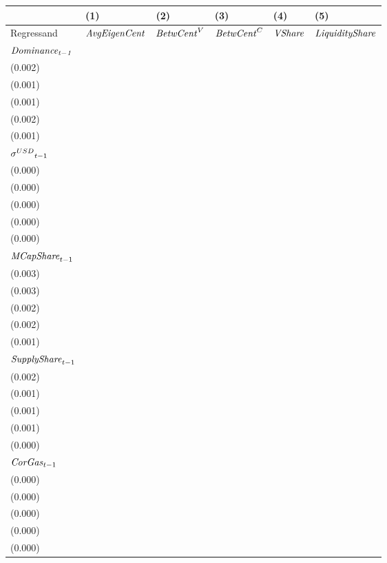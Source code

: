\begin{tabular}{llllll}
\toprule
{} &                                   (1) &                                   (2) &                                   (3) &                                  (4) &                                   (5) \\
\midrule
Regressand                   &                  ${\it AvgEigenCent}$ &                    ${\it BetwCent}^V$ &                    ${\it BetwCent}^C$ &                       ${\it VShare}$ &                ${\it LiquidityShare}$ \\
$\it Dominance_{t-1}$        &   \makecell{$0.722^{***}$ \\ (0.002)} &   \makecell{$0.828^{***}$ \\ (0.001)} &   \makecell{$0.927^{***}$ \\ (0.001)} &  \makecell{$0.722^{***}$ \\ (0.002)} &   \makecell{$0.970^{***}$ \\ (0.001)} \\
${{\it \sigma}^{USD}}_{t-1}$ &      \makecell{$0.000^{}$ \\ (0.000)} &      \makecell{$0.000^{}$ \\ (0.000)} &      \makecell{$0.000^{}$ \\ (0.000)} &     \makecell{$0.000^{}$ \\ (0.000)} &     \makecell{$-0.000^{}$ \\ (0.000)} \\
${{\it MCapShare}}_{t-1}$    &  \makecell{$-0.023^{***}$ \\ (0.003)} &   \makecell{$0.160^{***}$ \\ (0.003)} &   \makecell{$0.080^{***}$ \\ (0.002)} &  \makecell{$0.055^{***}$ \\ (0.002)} &   \makecell{$0.022^{***}$ \\ (0.001)} \\
${{\it SupplyShare}}_{t-1}$  &   \makecell{$0.031^{***}$ \\ (0.002)} &  \makecell{$-0.010^{***}$ \\ (0.001)} &  \makecell{$-0.003^{***}$ \\ (0.001)} &  \makecell{$0.016^{***}$ \\ (0.001)} &  \makecell{$-0.004^{***}$ \\ (0.000)} \\
${{\it CorGas}}_{t-1}$       &      \makecell{$0.000^{}$ \\ (0.000)} &      \makecell{$0.000^{}$ \\ (0.000)} &     \makecell{$-0.000^{}$ \\ (0.000)} &     \makecell{$0.000^{}$ \\ (0.000)} &  \makecell{$-0.000^{***}$ \\ (0.000)} \\

\end{tabular}

